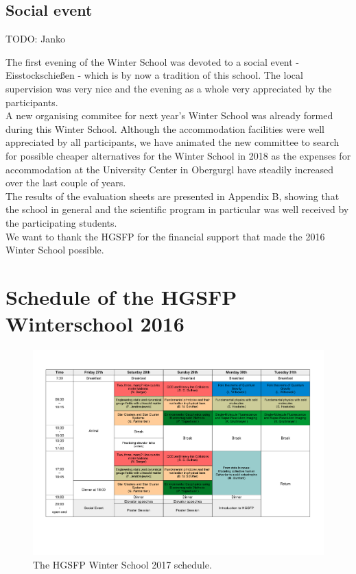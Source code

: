 \documentclass[11pt,a4paper]{article}
\numberwithin{equation}{section}
\numberwithin{table}{section}\setlength{\multlinegap}{25pt}
\begin{document}
\subsection*{Social event}

TODO: Janko

The first evening of the Winter School was devoted to a social event - Eisstockschie{\ss}en - which is by now a tradition of this school. The local supervision was very nice and the evening as a whole very appreciated by the participants.\\

A new organising commitee for next year's Winter School was already formed during this Winter School. Although the accommodation facilities were well appreciated by all participants, we have animated the new committee to search for possible cheaper alternatives for the Winter School in 2018 as the expenses for accommodation at the University Center in Obergurgl have steadily increased over the last couple of years.
\\
The results of the evaluation sheets are presented in Appendix B, showing that the school in general and the scientific program in particular was well received by the participating students.\\

\noindent We want to thank the HGSFP for the financial support that made the 2016 Winter School possible.


\newpage
\appendix
\section{Schedule of the HGSFP Winterschool 2016}

\begin{figure}[H]
\centering
\includegraphics[angle=90,width=0.999\textwidth]{FinalProgram.pdf}
\caption{The HGSFP Winter School 2017 schedule.}
\end{figure}
\newpage
\end{document}
